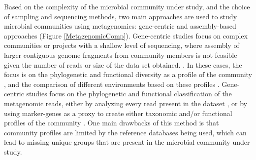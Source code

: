 Based on the complexity of the microbial community under study, and the choice of sampling and sequencing methods, two main approaches are used to study microbial communities using metagenomics: gene-centric and assembly-based approaches  (Figure \ref{MetagenomicComp}). 
Gene-centric studies focus on complex communities or projects with a shallow level of sequencing, where assembly of larger contiguous genome fragments from community members is not feasible given the number of reads or size of the data set obtained. . In these cases, the focus is on the phylogenetic and functional diversity as a profile of the community \cite{Ugalde:2013he,Brulc:2009fi}, and the comparison of different environments based on these profiles \cite{Dinsdale:2008cd,Willner:2009iv,Reed:2014jj}. Gene-centric studies focus on the phylogenetic and functional classification of the metagenomic reads, either by analyzing every read present in the dataset \cite{Brady:2011hi,Parks:2011bh,AmritaPati:2011ba}, or by using marker-genes as a proxy to create either taxonomic and/or functional profiles of the community \cite{Darling:2014ej,Segata:2012ba}.  One main drawbacks of this method is that community profiles are limited by the reference databases being used, which can lead to missing unique groups that are present in the microbial community under study. 


